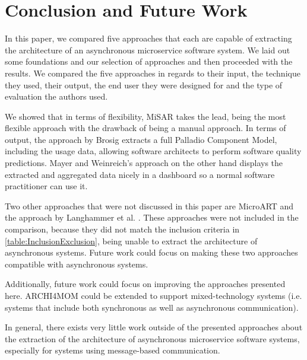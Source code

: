 
\section{Conclusion and Future Work}
\label{cha:Conclusion}
In this paper, we compared five approaches that each are capable of extracting the architecture of an asynchronous microservice software system.
We laid out some foundations and our selection of approaches and then proceeded with the results.
We compared the five approaches in regards to their input, the technique they used, their output, the end user they were designed for and the type of evaluation the authors used.

We showed that in terms of flexibility, MiSAR \cite{Alshuqayran2018MiSAR} takes the lead, being the most flexible approach with the drawback of being a manual approach.
In terms of output, the approach by Brosig \cite{Brosig2011} extracts a full Palladio Component Model, including the usage data, allowing software architects to perform software quality predictions.
Mayer and Weinreich's approach \cite{Mayer2018} on the other hand displays the extracted and aggregated data nicely in a dashboard so a normal software practitioner can use it.

Two other approaches that were not discussed in this paper are MicroART \cite{Granchelli2017MicroART} and the approach by Langhammer et al. \cite{Langhammer2016}.
These approaches were not included in the comparison, because they did not match the inclusion criteria in \autoref{table:InclusionExclusion}, being unable to extract the architecture of asynchronous systems.
Future work could focus on making these two approaches compatible with asynchronous systems.

Additionally, future work could focus on improving the approaches presented here.
ARCHI4MOM could be extended to support mixed-technology systems (i.e. systems that include both synchronous as well as asynchronous communication).

In general, there exists very little work outside of the presented approaches about the extraction of the architecture of asynchronous microservice software systems, especially for systems using message-based communication.